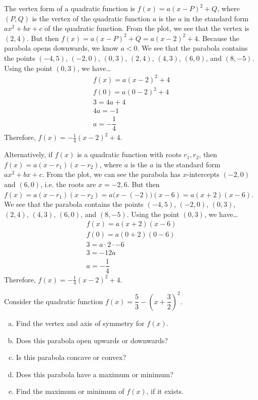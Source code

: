 \documentclass[12pt,letterpaper]{exam}
\begin{document}
\begin{questions}
\sol The vertex form of a quadratic function is $f(x)= a(x - P)^2 + Q$, where $(P, Q)$ is the vertex of the quadratic function $a$ is the $a$ in the standard form $ax^2 + bx + c$ of the quadratic function. From the plot, we see that the vertex is $(2, 4)$. But then $f(x)= a(x - P)^2 + Q= a(x - 2)^2 + 4$. Because the parabola opens downwards, we know $a < 0$. We see that the parabola contains the points $(-4, 5)$, $(-2, 0)$, $(0, 3)$, $(2, 4)$, $(4, 3)$, $(6, 0)$, and $(8, -5)$. Using the point $(0, 3)$, we have\dots
	\[
	\begin{gathered}
	f(x)= a(x - 2)^2 + 4 \\
	f(0)= a(0 - 2)^2 + 4 \\
	3= 4a + 4 \\
	4a= -1 \\
	a= -\dfrac{1}{4}
	\end{gathered}
	\]
Therefore, $f(x)= -\frac{1}{4} (x - 2)^2 + 4$. \pspace

Alternatively, if $f(x)$ is a quadratic function with roots $r_1, r_2$, then $f(x)= a(x - r_1)(x - r_2)$, where $a$ is the $a$ in the standard form $ax^2 + bx + c$. From the plot, we can see the parabola has $x$-intercepts $(-2, 0)$ and $(6, 0)$, i.e. the roots are $x= -2, 6$. But then $f(x)= a(x - r_1)(x - r_2)= a \big(x - (-2) \big) (x - 6)= a(x + 2)(x - 6)$. We see that the parabola contains the points $(-4, 5)$, $(-2, 0)$, $(0, 3)$, $(2, 4)$, $(4, 3)$, $(6, 0)$, and $(8, -5)$. Using the point $(0, 3)$, we have\dots
	\[
	\begin{gathered}
	f(x)= a(x + 2)(x - 6) \\
	f(0)= a(0 + 2)(0 - 6) \\
	3= a \cdot 2 \cdot -6 \\
	3= -12a \\
	a= -\dfrac{1}{4}
	\end{gathered}
	\]
Therefore, $f(x)= -\frac{1}{4} (x - 2)^2 + 4$.



\newpage
\question[10] Consider the quadratic function $f(x)= \dfrac{5}{3} - \left(x + \dfrac{3}{2} \right)^2$.
	\begin{enumerate}[(a)]
	\item Find the vertex and axis of symmetry for $f(x)$.
	\item Does this parabola open upwards or downwards?
	\item Is this parabola concave or convex?
	\item Does this parabola have a maximum or minimum? 
	\item Find the maximum or minimum of $f(x)$, if it exists. 
	\end{enumerate} \pspace


\end{questions}
\end{document}
